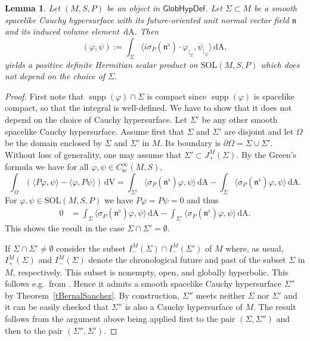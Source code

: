 \documentclass[a4paper,11pt]{amsart}
\newtheorem{lemma}[thm]{Lemma}
\theoremstyle{definition}
\begin{document}
\begin{lemma}\label{l:scalprodinvariant}
Let $(M,S,P)$ be an object in ${\mathsf{GlobHypDef}}$.
Let $\Sigma\subset M$ be a smooth spacelike Cauchy hypersurface with its future-oriented unit normal vector field $\mathfrak{n}$ and its induced volume element ${\,\mathrm{dA}}$.
Then
\begin{equation}
({\varphi},\psi):=\int_\Sigma {\langle} i\sigma_P(\mathfrak{n}^\flat)\cdot{\varphi}_{|_\Sigma},\psi_{|_\Sigma}{\rangle}{\,\mathrm{dA}},
\label{eq:ScalProd}
\end{equation}
yields a positive definite Hermitian scalar product on ${\mathrm{SOL}}(M,S,P)$ which does not depend on the choice of $\Sigma$.
\end{lemma}

\begin{proof}
First note that ${\operatorname{supp}}({\varphi})\cap\Sigma$ is compact since ${\operatorname{supp}}({\varphi})$ is spacelike compact, so that the integral is well-defined.
We have to show that it does not depend on the choice of Cauchy hypersurface.
Let $\Sigma'$ be any other smooth spacelike Cauchy hypersurface.
Assume first that $\Sigma$ and $\Sigma'$ are disjoint and let $\Omega$ be the domain enclosed by $\Sigma$ and $\Sigma'$ in $M$.
Its boundary is $\partial\Omega=\Sigma\cup\Sigma'$.
Without loss of generality, one may assume that $\Sigma'\subset J_+^M(\Sigma)$.
By the Green's formula \cite[p.~160, Prop.~9.1]{T1} we have for all ${\varphi},\psi \in {C^\infty_\mathrm{sc}}(M,S)$, 
\begin{equation}\label{eq:Green1storder}
\int_\Omega \left({\langle} P{\varphi},\psi{\rangle}-{\langle} {\varphi},P\psi{\rangle}\right) {\,\mathrm{dV}}
=
\int_{\Sigma'}{\langle}\sigma_P(\mathfrak{n}^\flat){\varphi},\psi{\rangle} {\,\mathrm{dA}}
-\int_{\Sigma}{\langle}\sigma_P(\mathfrak{n}^\flat){\varphi},\psi{\rangle} {\,\mathrm{dA}}.
\end{equation}
For ${\varphi},\psi\in{\mathrm{SOL}}(M,S,P)$ we have $P{\varphi}=P\psi=0$ and thus
\begin{align*}
0 
&=
\int_{\Sigma}{\langle}\sigma_P(\mathfrak{n}^\flat){\varphi},\psi{\rangle}{\,\mathrm{dA}} 
- \int_{\Sigma'}{\langle}\sigma_P(\mathfrak{n}^\flat){\varphi},\psi{\rangle}{\,\mathrm{dA}} .
\end{align*}
This shows the result in the case $\Sigma\cap\Sigma'=\emptyset$.

If $\Sigma\cap\Sigma'\neq\emptyset$ consider the subset $I_-^M(\Sigma)\cap I_-^M(\Sigma')$ of $M$ where, as usual, $I_+^M(\Sigma)$ and $I_-^M(\Sigma)$ denote the chronological future and past of the subset $\Sigma$ in $M$, respectively.
This subset is nonempty, open, and globally hyperbolic.
This follows e.g.\ from \cite[Lemma A.5.8]{BGP}.
Hence it admits a smooth spacelike Cauchy hypersurface $\Sigma''$ by Theorem~\ref{tBernalSanchez}.
By construction, $\Sigma''$ meets neither $\Sigma$ nor $\Sigma'$ and it can be easily checked that $\Sigma''$ is also a Cauchy hypersurface of $M$. 
The result follows from the argument above being applied first to the pair $(\Sigma,\Sigma'')$ and then to the pair $(\Sigma'',\Sigma')$.
\end{proof}
\end{document}
